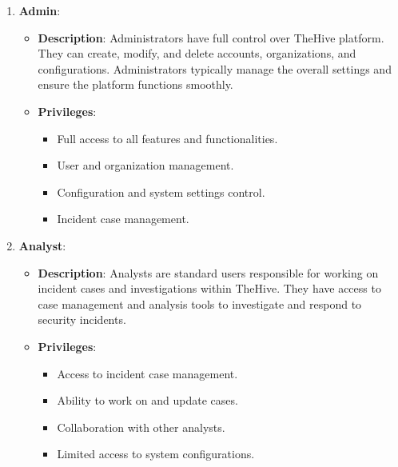 \documentclass{article}
\begin{document}
\begin{enumerate}
    \item \textbf{Admin}:
       \begin{itemize}
         \item \textbf{Description}: Administrators have full control over TheHive platform. They can create, modify, and delete accounts, organizations, and configurations. Administrators typically manage the overall settings and ensure the platform functions smoothly.
         \item \textbf{Privileges}:
         \begin{itemize}
           \item Full access to all features and functionalities.
           \item User and organization management.
           \item Configuration and system settings control.
           \item Incident case management.
         \end{itemize}
       \end{itemize}
    \item \textbf{Analyst}:
       \begin{itemize}
         \item \textbf{Description}: Analysts are standard users responsible for working on incident cases and investigations within TheHive. They have access to case management and analysis tools to investigate and respond to security incidents.
         \item \textbf{Privileges}:
         \begin{itemize}
           \item Access to incident case management.
           \item Ability to work on and update cases.
           \item Collaboration with other analysts.
           \item Limited access to system configurations.
         \end{itemize}
       \end{itemize}
  

\end{enumerate}
\end{document}
